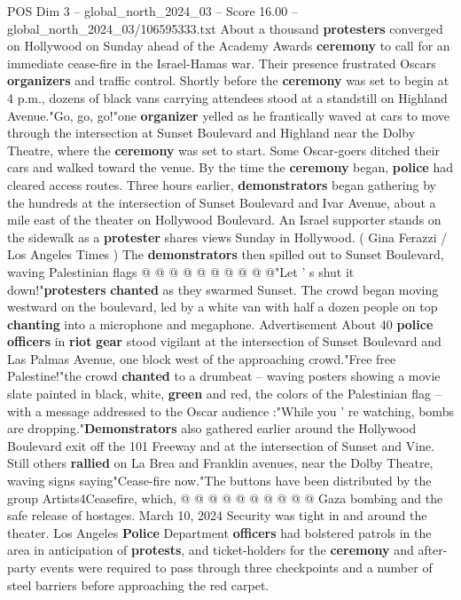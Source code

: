 \begin{textsample}{POS Dim 3 – global\_north\_2024\_03 – Score 16.00 – global\_north\_2024\_03/106595333.txt}  \label{ex:f3_pos_269}
About a thousand \textbf{protesters} converged on Hollywood on Sunday ahead of the Academy Awards \textbf{ceremony} to call for an immediate cease-fire in the Israel-Hamas war.
Their presence frustrated Oscars \textbf{organizers} and traffic control.
Shortly before the \textbf{ceremony} was set to begin at 4 p.m., dozens of black vans carrying attendees stood at a standstill on Highland Avenue."Go, go, go!"one \textbf{organizer} yelled as he frantically waved at cars to move through the intersection at Sunset Boulevard and Highland near the Dolby Theatre, where the \textbf{ceremony} was set to start.
Some Oscar-goers ditched their cars and walked toward the venue.
By the time the \textbf{ceremony} began, \textbf{police} had cleared access routes.
Three hours earlier, \textbf{demonstrators} began gathering by the hundreds at the intersection of Sunset Boulevard and Ivar Avenue, about a mile east of the theater on Hollywood Boulevard.
An Israel supporter stands on the sidewalk as a \textbf{protester} shares views Sunday in Hollywood. ( Gina Ferazzi / Los Angeles Times ) The \textbf{demonstrators} then spilled out to Sunset Boulevard, waving Palestinian flags @ @ @ @ @ @ @ @ @ @"Let ' s shut it down!"\textbf{protesters} \textbf{chanted} as they swarmed Sunset.
The crowd began moving westward on the boulevard, led by a white van with half a dozen people on top \textbf{chanting} into a microphone and megaphone.
Advertisement About 40 \textbf{police} \textbf{officers} in \textbf{riot} \textbf{gear} stood vigilant at the intersection of Sunset Boulevard and Las Palmas Avenue, one block west of the approaching crowd."Free free Palestine!"the crowd \textbf{chanted} to a drumbeat -- waving posters showing a movie slate painted in black, white, \textbf{green} and red, the colors of the Palestinian flag -- with a message addressed to the Oscar audience :"While you ' re watching, bombs are dropping."\textbf{Demonstrators} also gathered earlier around the Hollywood Boulevard exit off the 101 Freeway and at the intersection of Sunset and Vine.
Still others \textbf{rallied} on La Brea and Franklin avenues, near the Dolby Theatre, waving signs saying"Cease-fire now."The buttons have been distributed by the group Artists4Ceasefire, which, @ @ @ @ @ @ @ @ @ @ Gaza bombing and the safe release of hostages.
March 10, 2024 Security was tight in and around the theater.
Los Angeles \textbf{Police} Department \textbf{officers} had bolstered patrols in the area in anticipation of \textbf{protests}, and ticket-holders for the \textbf{ceremony} and after-party events were required to pass through three checkpoints and a number of steel barriers before approaching the red carpet.

\end{textsample}

